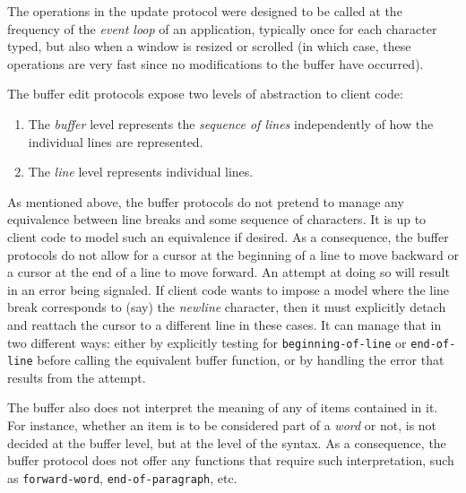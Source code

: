 The operations in the update protocol were designed to be called at
the frequency of the \emph{event loop} of an application, typically
once for each character typed, but also when a window is resized or
scrolled (in which case, these operations are very fast since no
modifications to the buffer have occurred).

The buffer edit protocols expose two levels of abstraction to client
code:

\begin{enumerate}
\item The \emph{buffer} level represents the \emph{sequence of lines}
  independently of how the individual lines are represented.
\item The \emph{line} level represents individual lines.
\end{enumerate}

As mentioned above, the buffer protocols do not pretend to manage any
equivalence between line breaks and some sequence of characters.  It
is up to client code to model such an equivalence if desired.  As a
consequence, the buffer protocols do not allow for a cursor at the
beginning of a line to move backward or a cursor at the end of a line
to move forward.  An attempt at doing so will result in an error being
signaled.  If client code wants to impose a model where the line break
corresponds to (say) the \emph{newline} character, then it must
explicitly detach and reattach the cursor to a different line in these
cases.  It can manage that in two different ways: either by explicitly
testing for \texttt{beginning-of-line} or \texttt{end-of-line} before
calling the equivalent buffer function, or by handling the error that
results from the attempt.

The buffer also does not interpret the meaning of any of items
contained in it.  For instance, whether an item is to be considered
part of a \emph{word} or not, is not decided at the buffer level, but
at the level of the syntax.  As a consequence, the buffer protocol
does not offer any functions that require such interpretation, such as
\texttt{forward-word}, \texttt{end-of-paragraph}, etc.
